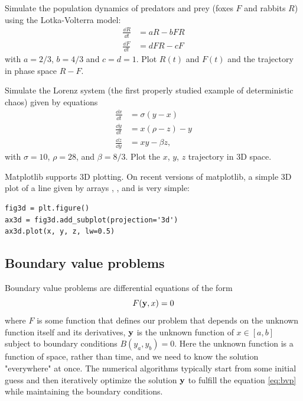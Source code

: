 \begin{exercise}
    Simulate the population dynamics of predators and prey (foxes $F$ and rabbits $R$) using the Lotka-Volterra model:
    \begin{equation*}
        \begin{aligned}
            \frac{\dd R}{\dd t} &= aR - bFR\\
            \frac{\dd F}{\dd t} &= dFR - cF
        \end{aligned}
    \end{equation*}
    with $a = 2/3$, $b = 4/3$ and $c = d = 1$. Plot $R(t)$ and $F(t)$ and the trajectory in phase space $R-F$.
\end{exercise}

\begin{exercise}
    Simulate the Lorenz system (the first properly studied example of deterministic chaos) given by equations
    \begin{equation*}
        \begin{aligned}
            \frac{\dd x}{\dd t} &= \sigma (y - x)\\
            \frac{\dd y}{\dd t} &= x(\rho - z) - y\\
            \frac{\dd z}{\dd y} &= xy - \beta z,
        \end{aligned}
    \end{equation*}
    with $\sigma = 10$, $\rho = 28$, and $\beta = 8/3$. Plot the $x$, $y$, $z$ trajectory in 3D space.
\end{exercise}

\begin{syntax}[3D plotting]
Matplotlib supports 3D plotting. On recent versions of matplotlib, a simple 3D plot of a line given by arrays , , and  is very simple:
\begin{lstlisting}
fig3d = plt.figure()
ax3d = fig3d.add_subplot(projection='3d')
ax3d.plot(x, y, z, lw=0.5)
\end{lstlisting}
\end{syntax}

\subsection{Boundary value problems}
Boundary value problems are differential equations of the form
\begin{equation}
    \label{eq:bvp}
    F(\mathbf{y}, x) = 0
\end{equation}
where $F$ is some function that defines our problem that depends on the unknown function itself and its derivatives, $\mathbf{y}$ is the unknown function of $x \in [a,b]$ subject to boundary conditions $B(y_a, y_b) = 0$. Here the unknown function is a function of space, rather than time, and we need to know the solution "everywhere" at once. The numerical algorithms typically start from some initial guess and then iteratively optimize the solution $\mathbf{y}$ to fulfill the equation \eqref{eq:bvp} while maintaining the boundary conditions.

